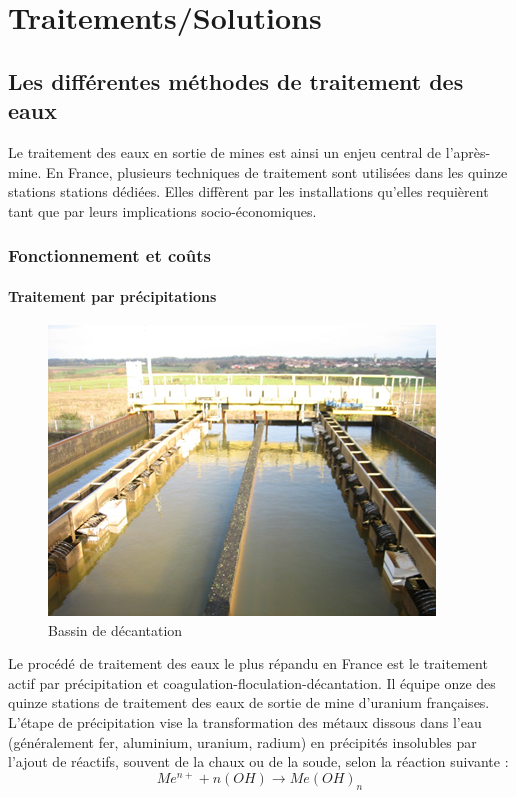 \documentclass{article}
\begin{document}
\newpage
\section{Traitements/Solutions}
\subsection{Les différentes méthodes de traitement des eaux}
Le traitement des eaux en sortie de mines est ainsi un enjeu central de l’après-mine. En France, plusieurs techniques de traitement sont utilisées dans les quinze stations stations dédiées. Elles diffèrent par les installations qu’elles requièrent tant que par leurs implications socio-économiques.

\subsubsection{Fonctionnement et coûts}
\paragraph{Traitement par précipitations} \hspace{1 em}

\begin{figure}[H]
\centering
\includegraphics[width = 0.5\linewidth]{III_A_1.png}
\caption{Bassin de décantation}
\label{fig:bassin_decantation}
\end{figure}

Le procédé de traitement des eaux le plus répandu en France est le traitement actif par précipitation et coagulation-floculation-décantation. Il équipe onze des quinze stations de traitement des eaux de sortie de mine d'uranium françaises. 
L’étape de précipitation vise la transformation des métaux dissous dans l’eau (généralement fer, aluminium, uranium, radium) en précipités insolubles par l’ajout de réactifs, souvent de la chaux ou de la soude, selon la réaction suivante :   
$$Me^{n+} + n(OH) \rightarrow Me(OH)_{n}$$
          	
\end{document}
